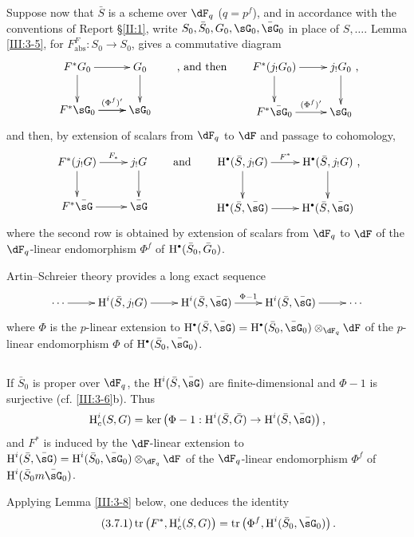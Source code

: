 Suppose now that $\bar S$ is a scheme over $\dF_q$ ($q=p^f$), and in
accordance with the conventions of Report \S\ref{II:1}, write
$S_0,\bar S_0,G_0,\sG_0,\bar\sG_0$ in place of $S,\dots$. Lemma
\ref{III:3-5}, for $F_\text{abs}^F:S_0\to S_0$, gives a commutative diagram
\[\xymatrix{
  F^* G_0 \ar[r] \ar[d]
    & G_0 \ar[d] \\
  F^*\sG_0 \ar[r]^-{(\Phi^f)'} \ar[r]
    & \sG_0
}\qquad\text{, and then}\qquad
\xymatrix{
  F^*(j_! G_0) \ar[r] \ar[d]
    & j_!G_0 \ar[d] \\
  F^*\bar\sG_0 \ar[r]^-{(\Phi^f)'}
    & \sG_0
}\text{,}
\]
and then, by extension of scalars from $\dF_q$ to $\dF$ and passage to
cohomology,
\[\xymatrix{
  F^*(j_! G) \ar[r]^-{F_*} \ar[d]
    & j_!G \ar[d] \\
  F^*\bar\sG \ar[r]
    & \bar\sG
}\qquad\text{and}\qquad
\xymatrix{
  \h^\bullet(\bar S,j_! G) \ar[r]^-{F^*} \ar[d]
    & \h^\bullet(\bar S,j_!G) \ar[d] \\
  \h^\bullet(\bar S,\bar\sG) \ar[r]
    & \h^\bullet(\bar S,\bar\sG)
}\text{,}
\]
where the second row is obtained by extension of scalars from $\dF_q$ to
$\dF$ of the $\dF_q$-linear endomorphism $\Phi^f$ of
$\h^\bullet(\bar S_0,\bar G_0)$.

Artin--Schreier theory provides a long exact sequence
\[\xymatrix{
  \cdots \ar[r]
    & \h^i(\bar S,j_! G) \ar[r]
    & \h^i(\bar S,\bar\sG) \ar[r]^-{\Phi-1}
    & \h^i(\bar S,\bar\sG) \ar[r]
    & \cdots
}\]
where $\Phi$ is the $p$-linear extension to
$\h^\bullet(\bar S,\bar \sG)= \h^\bullet(\bar S_0,\bar\sG_0)\otimes_{\dF_q}\dF$
of the $p$-linear endomorphism $\Phi$ of
$\h^\bullet(\bar S_0,\bar\sG_0)$.






\subsection{}\label{III:3-7}

If $\bar S_0$ is proper over $\dF_q$, the $\h^i(\bar S,\bar\sG)$ are
finite-dimensional and $\Phi-1$ is surjective (cf. \ref{III:3-6}b). Thus
\[
  \h_c^i(S,G) = \ker\left(\Phi-1 : \h^i(\bar S,\bar G) \to \h^i(\bar S,\bar\sG)\right) \text{,}
\]
and $F^*$ is induced by the $\dF$-linear extension to
$\h^i(\bar S,\bar\sG) = \h^i(\bar S_0,\bar\sG_0)\otimes_{\dF_q}\dF$ of the
$\dF_q$-linear endomorphism $\Phi^f$ of $\h^i(\bar S_0m\bar\sG_0)$.

Applying Lemma \ref{III:3-8} below, one deduces the identity
\begin{equation*}\tag{3.7.1}\label{III:eq:3-7-1}
  \tr\left(F^*,\h_c^i(S,G)\right) = \tr\left(\Phi^f,\h^i(\bar S_0,\bar\sG_0)\right) \text{.}
\end{equation*}






